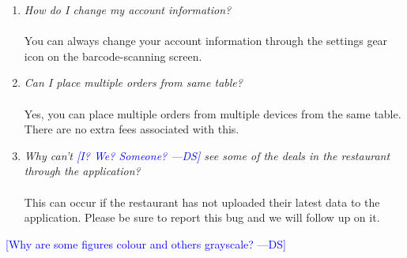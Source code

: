 \documentclass[12pt, titlepage]{article}
\newcommand{\authornote}[3]{\textcolor{#1}{[#3 ---#2]}}
\newcommand{\authornote}[3]{}
\newcommand{\ds}[1]{\authornote{blue}{DS}{#1}}
\begin{document}
\begin{enumerate}
	\item \emph{How do I change my account information?}\\\\
	You can always change your account information through the settings gear icon on the barcode-scanning screen.
	\item \emph{Can I place multiple orders from same table?}\\\\
	Yes, you can place multiple orders from multiple devices from the same table. There are no extra fees associated with this. 
	\item \emph{Why can't \ds{I? We? Someone?}
	see some of the deals in the restaurant through the application?}\\\\
	This can occur if the restaurant has not uploaded their latest data to the application. Please be sure to report this bug and we will follow up on it.
\end{enumerate}
	

\ds{Why are some figures colour and others grayscale?}
\end{document}
